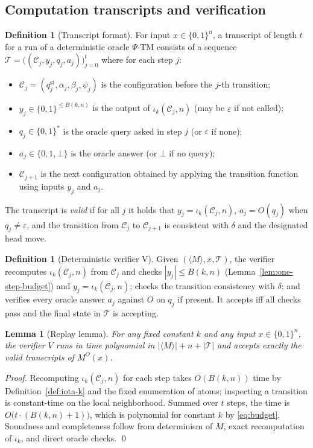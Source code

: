 \documentclass[11pt]{article}
\newtheorem{lemma}[theorem]{Lemma}
\theoremstyle{plain}
\theoremstyle{definition}
\newtheorem{definition}[theorem]{Definition}
\newcommand{\PSi}{\Psi}
\newcommand{\bits}{\{0,1\}}
\begin{document}
\subsection{Computation transcripts and verification}
\label{subsec:transcript-verifier}

\begin{definition}[Transcript format]
\label{def:transcript}
For input $x\in\bits^n$, a transcript of length $t$ for a run of a deterministic oracle $\PSi$-TM consists of a sequence $\mathcal{T}=\big((\mathcal{C}_j, y_j, q_j, a_j)\big)_{j=0}^{t}$ where for each step $j$:
\begin{itemize}
  \item $\mathcal{C}_j=(q_j^{\mathrm{st}},\alpha_j,\beta_j,\psi_j)$ is the configuration before the $j$-th transition;
  \item $y_j\in\bits^{\le B(k,n)}$ is the output of $\iota_k(\mathcal{C}_j,n)$ (may be $\varepsilon$ if not called);
  \item $q_j\in\bits^*$ is the oracle query asked in step $j$ (or $\varepsilon$ if none);
  \item $a_j\in\{0,1,\bot\}$ is the oracle answer (or $\bot$ if no query);
  \item $\mathcal{C}_{j+1}$ is the next configuration obtained by applying the transition function using inputs $y_j$ and $a_j$.
\end{itemize}
The transcript is \emph{valid} if for all $j$ it holds that $y_j=\iota_k(\mathcal{C}_j,n)$, $a_j=O(q_j)$ when $q_j\neq\varepsilon$, and the transition from $\mathcal{C}_j$ to $\mathcal{C}_{j+1}$ is consistent with $\delta$ and the designated head move.
\end{definition}

\begin{definition}[Deterministic verifier V]
\label{def:verifier}
Given $(\langle M\rangle,x,\mathcal{T})$, the verifier recomputes $\iota_k(\mathcal{C}_j,n)$ from $\mathcal{C}_j$ and checks $|y_j|\le B(k,n)$ (Lemma~\ref{lem:one-step-budget}) and $y_j=\iota_k(\mathcal{C}_j,n)$; checks the transition consistency with $\delta$; and verifies every oracle answer $a_j$ against $O$ on $q_j$ if present. It accepts iff all checks pass and the final state in $\mathcal{T}$ is accepting.
\end{definition}

\begin{lemma}[Replay lemma]
\label{lem:replay}
For any fixed constant $k$ and any input $x\in\bits^n$, the verifier $V$ runs in time polynomial in $|\langle M\rangle|+n+|\mathcal{T}|$ and accepts exactly the valid transcripts of $M^{O}(x)$.
\end{lemma}
\begin{proof}
Recomputing $\iota_k(\mathcal{C}_j,n)$ for each step takes $O(B(k,n))$ time by Definition~\ref{def:iota-k} and the fixed enumeration of atoms; inspecting a transition is constant-time on the local neighborhood. Summed over $t$ steps, the time is $O\big(t\cdot(B(k,n)+1)\big)$, which is polynomial for constant $k$ by \eqref{eq:budget}. Soundness and completeness follow from determinism of $M$, exact recomputation of $\iota_k$, and direct oracle checks. \qed
\end{proof}
\end{document}
